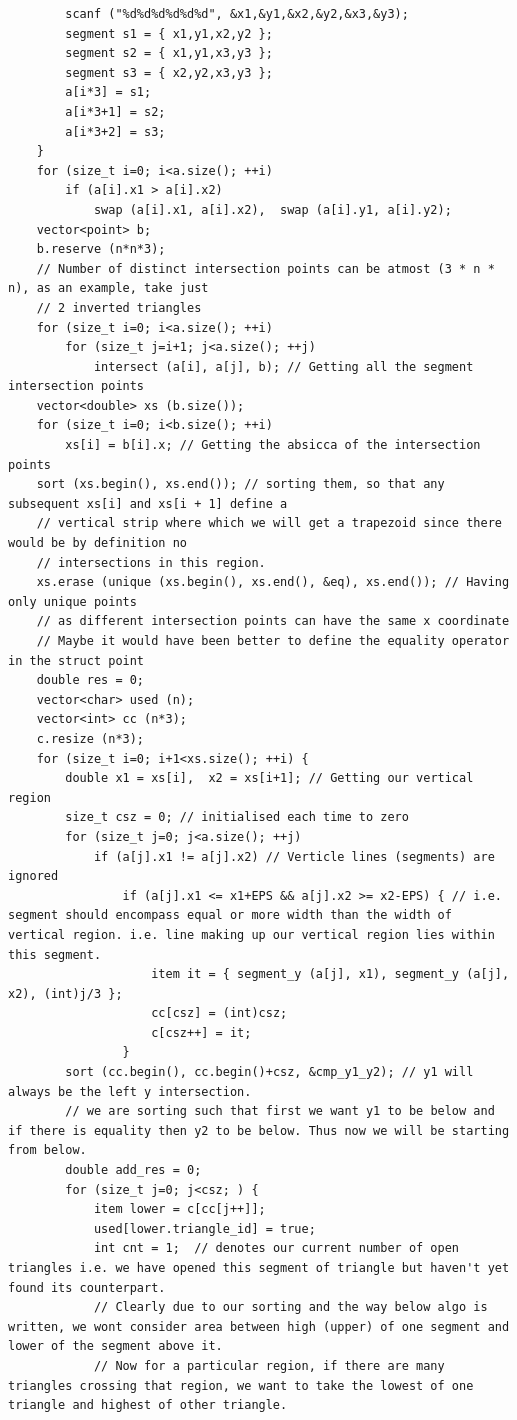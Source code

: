 \documentclass[8pt, a4paper, oneside, twocolumn]{extarticle}
\begin{document}
\begin{itemize}
\begin{verbatim}
		scanf ("%d%d%d%d%d%d", &x1,&y1,&x2,&y2,&x3,&y3);
		segment s1 = { x1,y1,x2,y2 };
		segment s2 = { x1,y1,x3,y3 };
		segment s3 = { x2,y2,x3,y3 };
		a[i*3] = s1;
		a[i*3+1] = s2;
		a[i*3+2] = s3;
	}
	for (size_t i=0; i<a.size(); ++i)
		if (a[i].x1 > a[i].x2)
			swap (a[i].x1, a[i].x2),  swap (a[i].y1, a[i].y2);
	vector<point> b;
	b.reserve (n*n*3);
	// Number of distinct intersection points can be atmost (3 * n * n), as an example, take just
	// 2 inverted triangles
	for (size_t i=0; i<a.size(); ++i)
		for (size_t j=i+1; j<a.size(); ++j)
			intersect (a[i], a[j], b); // Getting all the segment intersection points
	vector<double> xs (b.size());
	for (size_t i=0; i<b.size(); ++i)
		xs[i] = b[i].x; // Getting the absicca of the intersection points
	sort (xs.begin(), xs.end()); // sorting them, so that any subsequent xs[i] and xs[i + 1] define a
	// vertical strip where which we will get a trapezoid since there would be by definition no
	// intersections in this region.
	xs.erase (unique (xs.begin(), xs.end(), &eq), xs.end()); // Having only unique points
	// as different intersection points can have the same x coordinate
	// Maybe it would have been better to define the equality operator in the struct point
	double res = 0;
	vector<char> used (n);
	vector<int> cc (n*3);
	c.resize (n*3);
	for (size_t i=0; i+1<xs.size(); ++i) {
		double x1 = xs[i],  x2 = xs[i+1]; // Getting our vertical region
		size_t csz = 0; // initialised each time to zero
		for (size_t j=0; j<a.size(); ++j)
			if (a[j].x1 != a[j].x2) // Verticle lines (segments) are ignored
				if (a[j].x1 <= x1+EPS && a[j].x2 >= x2-EPS) { // i.e. segment should encompass equal or more width than the width of vertical region. i.e. line making up our vertical region lies within this segment.
					item it = { segment_y (a[j], x1), segment_y (a[j], x2), (int)j/3 };
					cc[csz] = (int)csz;
					c[csz++] = it;
				}
		sort (cc.begin(), cc.begin()+csz, &cmp_y1_y2); // y1 will always be the left y intersection.
		// we are sorting such that first we want y1 to be below and if there is equality then y2 to be below. Thus now we will be starting from below.
		double add_res = 0;
		for (size_t j=0; j<csz; ) {
			item lower = c[cc[j++]];
			used[lower.triangle_id] = true;
			int cnt = 1;  // denotes our current number of open triangles i.e. we have opened this segment of triangle but haven't yet found its counterpart.
			// Clearly due to our sorting and the way below algo is written, we wont consider area between high (upper) of one segment and lower of the segment above it.
			// Now for a particular region, if there are many triangles crossing that region, we want to take the lowest of one triangle and highest of other triangle.

\end{verbatim}
\end{itemize}
\end{document}
